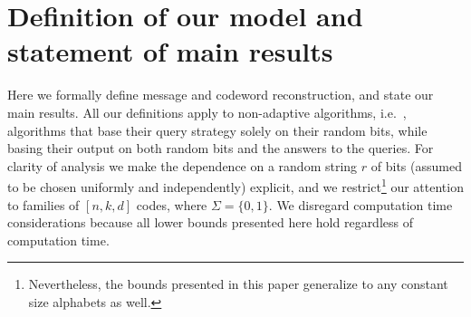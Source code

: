 \documentclass[10pt]{article}
\theoremstyle{definition}
\providecommand{\ie}{i.e.\ }
\numberwithin{equation}{section}
\newcommand{\zo}{{\{0,1\}}}
\begin{document}
\section{Definition of our model and statement of main results}\label{sec:recdef}
Here we formally define message and codeword reconstruction, and state our main results. All our definitions apply to non-adaptive algorithms, \ie, algorithms that base their query strategy solely on their random bits, while basing their output on both random bits and the answers to the queries. For clarity of analysis we make the dependence on a random string $r$ of bits (assumed to be chosen uniformly and independently) explicit, and we restrict\footnote{Nevertheless, the bounds presented in this paper generalize to any constant size alphabets as well.} our attention to families of $[n,k,d]$ codes, where $\Sigma = \zo$. We disregard computation time considerations because all lower bounds presented here hold regardless of computation time.
\end{document}
